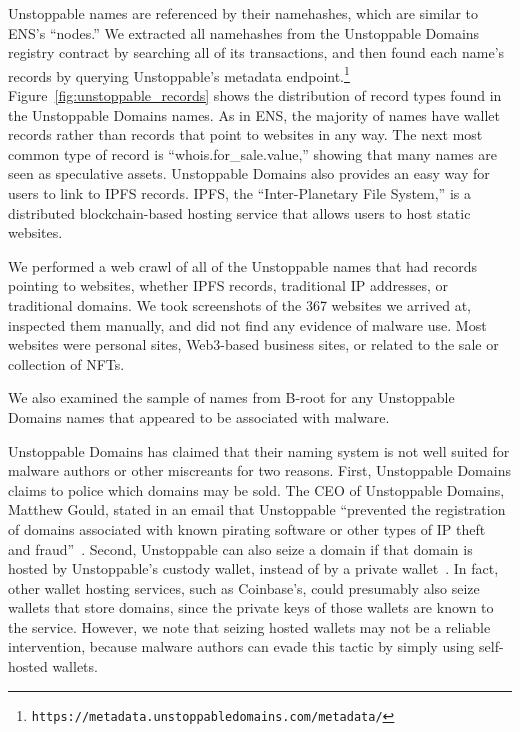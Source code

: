 Unstoppable names are referenced by their namehashes, which are 
similar to ENS's ``nodes.'' We extracted all namehashes from the 
Unstoppable Domains registry contract by searching all of its 
transactions, and then found each name's records by querying 
Unstoppable's metadata endpoint.\footnote{
	\texttt{https://metadata.unstoppabledomains.com/metadata/}} 
Figure~\ref{fig:unstoppable_records} shows the 
distribution 
of record types found in the Unstoppable Domains names. As in 
ENS, the majority of names have wallet records rather than 
records that point to websites in any way. The next most common 
type of record is ``whois.for\_sale.value,'' showing that many 
names are seen as speculative assets. Unstoppable Domains also 
provides an easy way for users to link to IPFS records. IPFS, 
the ``Inter-Planetary File System,'' is a distributed 
blockchain-based hosting service that allows users to host 
static websites.

We performed a web crawl of all of the Unstoppable names that 
had records pointing to websites, whether IPFS records, 
traditional IP addresses, or traditional domains. We took 
screenshots of the 367 websites we arrived 
at, inspected them manually, and did not find any evidence of 
malware use. Most 
websites were personal sites, Web3-based business sites, or related to the sale 
or collection of NFTs. 

We also examined the sample of names from B-root for any Unstoppable Domains 
names that appeared to be associated with malware. 

Unstoppable Domains has claimed that their naming system is not well suited for 
malware authors or other miscreants for two reasons. First, Unstoppable Domains 
claims to police which domains may be sold. The CEO of Unstoppable Domains, 
Matthew Gould, stated in an email that Unstoppable ``prevented the 
registration of domains associated with known pirating software or other types 
of IP theft and fraud''~\cite{pegoraro_blockchain_2021}. Second, Unstoppable 
can also seize a domain if that 
domain is hosted by Unstoppable's custody 
wallet, instead of by a private wallet~\cite{pegoraro_blockchain_2021}. In 
fact, other wallet hosting 
services, such as Coinbase's, 
could presumably also seize wallets that store domains, since the private 
keys of those wallets are 
known to the service. However, we note that seizing hosted wallets may not 
be a reliable 
intervention, because malware authors can evade this tactic by simply using 
self-hosted wallets. 

